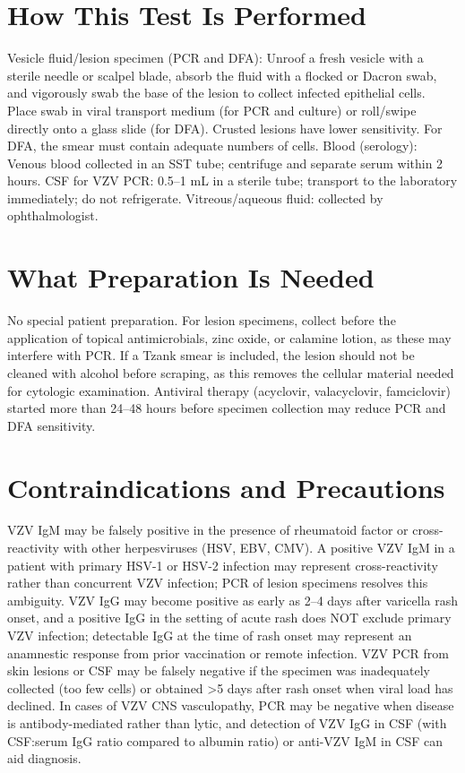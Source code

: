 \section*{How This Test Is Performed}
Vesicle fluid/lesion specimen (PCR and DFA): Unroof a fresh vesicle with a sterile needle or scalpel blade, absorb the fluid with a flocked or Dacron swab, and vigorously swab the base of the lesion to collect infected epithelial cells. Place swab in viral transport medium (for PCR and culture) or roll/swipe directly onto a glass slide (for DFA). Crusted lesions have lower sensitivity. For DFA, the smear must contain adequate numbers of cells. Blood (serology): Venous blood collected in an SST tube; centrifuge and separate serum within 2 hours. CSF for VZV PCR: 0.5--1 mL in a sterile tube; transport to the laboratory immediately; do not refrigerate. Vitreous/aqueous fluid: collected by ophthalmologist.

\section*{What Preparation Is Needed}
No special patient preparation. For lesion specimens, collect before the application of topical antimicrobials, zinc oxide, or calamine lotion, as these may interfere with PCR. If a Tzank smear is included, the lesion should not be cleaned with alcohol before scraping, as this removes the cellular material needed for cytologic examination. Antiviral therapy (acyclovir, valacyclovir, famciclovir) started more than 24--48 hours before specimen collection may reduce PCR and DFA sensitivity.

\section*{Contraindications and Precautions}
VZV IgM may be falsely positive in the presence of rheumatoid factor or cross-reactivity with other herpesviruses (HSV, EBV, CMV). A positive VZV IgM in a patient with primary HSV-1 or HSV-2 infection may represent cross-reactivity rather than concurrent VZV infection; PCR of lesion specimens resolves this ambiguity. VZV IgG may become positive as early as 2--4 days after varicella rash onset, and a positive IgG in the setting of acute rash does NOT exclude primary VZV infection; detectable IgG at the time of rash onset may represent an anamnestic response from prior vaccination or remote infection. VZV PCR from skin lesions or CSF may be falsely negative if the specimen was inadequately collected (too few cells) or obtained >5 days after rash onset when viral load has declined. In cases of VZV CNS vasculopathy, PCR may be negative when disease is antibody-mediated rather than lytic, and detection of VZV IgG in CSF (with CSF:serum IgG ratio compared to albumin ratio) or anti-VZV IgM in CSF can aid diagnosis.

